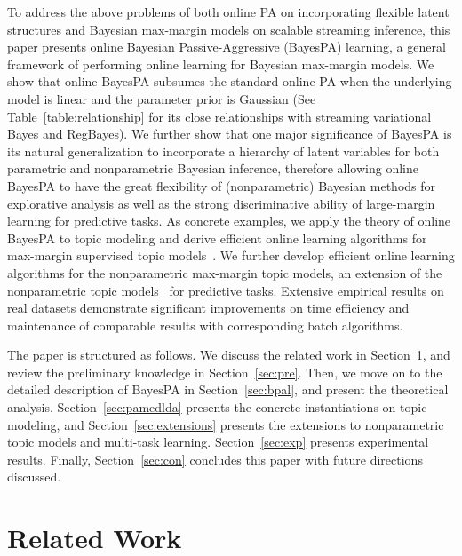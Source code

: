 \documentclass[twoside,11pt]{article}
\begin{document}
To address the above problems of both online PA on incorporating flexible latent structures and Bayesian max-margin models on scalable streaming inference, this paper presents online Bayesian Passive-Aggressive (BayesPA) learning, a general framework of performing online learning for Bayesian max-margin models. %
We show that online BayesPA subsumes the standard online PA when the underlying model is linear and the parameter prior is Gaussian (See Table~\ref{table:relationship} for its close relationships with streaming variational Bayes and RegBayes). We further show that one major significance of BayesPA is its natural generalization to incorporate a hierarchy of latent variables for both parametric and nonparametric Bayesian inference, therefore allowing online BayesPA to have the great flexibility of (nonparametric) Bayesian methods for explorative analysis as well as the strong discriminative ability of large-margin learning for predictive tasks. As concrete examples, we apply the theory of online BayesPA to topic modeling and derive efficient online learning algorithms for max-margin supervised topic models~\citep{zhu2012medlda}. We further develop efficient online learning algorithms for the nonparametric max-margin topic models, an extension of the nonparametric topic models~\citep{teh2006hierarchical} for predictive tasks. Extensive empirical results on real datasets demonstrate significant improvements on time efficiency and maintenance of comparable results with corresponding batch algorithms.

The paper is structured as follows. We discuss the related work in Section~\ref{sec:relatedwork}, and review the preliminary knowledge in Section~\ref{sec:pre}. Then, we move on to the detailed description of BayesPA in Section~\ref{sec:bpal}, and present the theoretical analysis. Section~\ref{sec:pamedlda} presents the concrete instantiations on topic modeling, and Section~\ref{sec:extensions} presents the extensions to nonparametric topic models and multi-task learning. Section~\ref{sec:exp} presents experimental results. Finally, Section~\ref{sec:con} concludes this paper with future directions discussed.

\section{Related Work}\label{sec:relatedwork}
\end{document}
